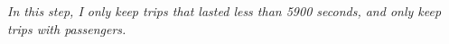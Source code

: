 \documentclass{tikzposter} %
\begin{document}
\begin{columns}
{\begin{description}
\vspace{2cm}
  \textit{ {\LARGE  In this step,
    I only keep trips that lasted less than 5900 seconds, and only keep trips with passengers.}}
\end{description}
}



\end{columns}
\end{document}
